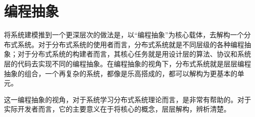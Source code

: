 
\section{编程抽象}

将系统建模推到一个更深层次的做法是，以“编程抽象”为核心载体，去解构一个分布式系统。对于分布式系统的使用者而言，分布式系统就是不同层级的各种编程抽象；对于分布式系统的构建者而言，其核心任务就是用设计层的算法、协议和系统层的代码去实现不同的编程抽象。在编程抽象的视角下，分布式系统就是层层编程抽象的组合，一个再复杂的系统，都像是乐高搭成的，都可以解构为更基本的单元。

这一编程抽象的视角，对于系统学习分布式系统理论而言，是非常有帮助的。对于实际开发者而言，它的主要意义在于将核心的概念，层层解构，辨析清楚。

